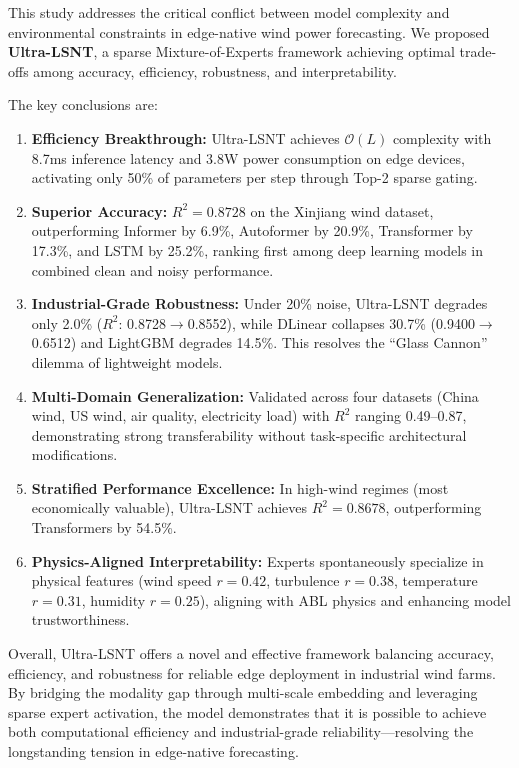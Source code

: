 \documentclass[review,3p,times,draft]{elsarticle}
\begin{document}
This study addresses the critical conflict between model complexity and environmental constraints in edge-native wind power forecasting. We proposed \textbf{Ultra-LSNT}, a sparse Mixture-of-Experts framework achieving optimal trade-offs among accuracy, efficiency, robustness, and interpretability.

The key conclusions are:

\begin{enumerate}[label=(\arabic*)]
    \item \textbf{Efficiency Breakthrough:} Ultra-LSNT achieves $\mathcal{O}(L)$ complexity with 8.7ms inference latency and 3.8W power consumption on edge devices, activating only 50\% of parameters per step through Top-2 sparse gating.
    
    \item \textbf{Superior Accuracy:} $R^2=0.8728$ on the Xinjiang wind dataset, outperforming Informer by 6.9\%, Autoformer by 20.9\%, Transformer by 17.3\%, and LSTM by 25.2\%, ranking first among deep learning models in combined clean and noisy performance.
    
    \item \textbf{Industrial-Grade Robustness:} Under 20\% noise, Ultra-LSNT degrades only 2.0\% ($R^2$: 0.8728$\rightarrow$0.8552), while DLinear collapses 30.7\% (0.9400$\rightarrow$0.6512) and LightGBM degrades 14.5\%. This resolves the ``Glass Cannon'' dilemma of lightweight models.
    
    \item \textbf{Multi-Domain Generalization:} Validated across four datasets (China wind, US wind, air quality, electricity load) with $R^2$ ranging 0.49--0.87, demonstrating strong transferability without task-specific architectural modifications.
    
    \item \textbf{Stratified Performance Excellence:} In high-wind regimes (most economically valuable), Ultra-LSNT achieves $R^2=0.8678$, outperforming Transformers by 54.5\%.
    
    \item \textbf{Physics-Aligned Interpretability:} Experts spontaneously specialize in physical features (wind speed $r=0.42$, turbulence $r=0.38$, temperature $r=0.31$, humidity $r=0.25$), aligning with ABL physics and enhancing model trustworthiness.
\end{enumerate}

Overall, Ultra-LSNT offers a novel and effective framework balancing accuracy, efficiency, and robustness for reliable edge deployment in industrial wind farms. By bridging the modality gap through multi-scale embedding and leveraging sparse expert activation, the model demonstrates that it is possible to achieve both computational efficiency and industrial-grade reliability---resolving the longstanding tension in edge-native forecasting.
\end{document}
